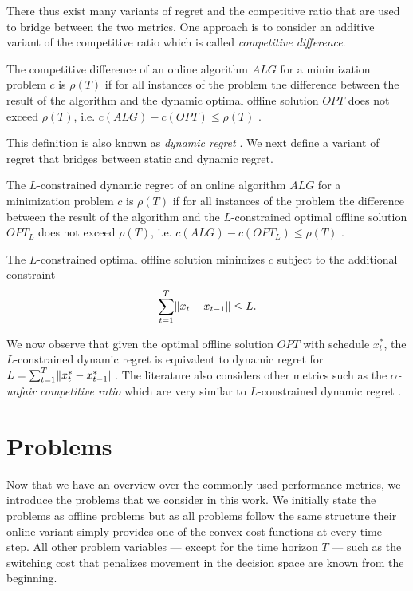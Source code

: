 There thus exist many variants of regret and the competitive ratio that are used to bridge between the two metrics. One approach is to consider an additive variant of the competitive ratio which is called \textit{competitive difference}.

\begin{definition}
The competitive difference of an online algorithm $ALG$ for a minimization problem $c$ is $\rho(T)$ if for all instances of the problem the difference between the result of the algorithm and the dynamic optimal offline solution $OPT$ does not exceed $\rho(T)$, i.e. $c(ALG) - c(OPT) \leq \rho(T)$ \cite{Chen2015}.
\end{definition}

This definition is also known as \textit{dynamic regret} \cite{Chen2018}. We next define a variant of regret that bridges between static and dynamic regret.

\begin{definition}
The $L$-constrained dynamic regret of an online algorithm $ALG$ for a minimization problem $c$ is $\rho(T)$ if for all instances of the problem the difference between the result of the algorithm and the $L$-constrained optimal offline solution $OPT_L$ does not exceed $\rho(T)$, i.e. $c(ALG) - c(OPT_L) \leq \rho(T)$ \cite{Chen2018}.

The $L$-constrained optimal offline solution minimizes $c$ subject to the additional constraint \begin{align*}
    \sum_{t=1}^T \lVert x_t - x_{t-1}\rVert \leq L.
\end{align*}
\end{definition}

We now observe that given the optimal offline solution $OPT$ with schedule $x_t^*$, the $L$-constrained dynamic regret is equivalent to dynamic regret for $L = \sum_{t=1}^T \lVert x_t^* - x_{t-1}^*\rVert$. The literature also considers other metrics such as the \textit{$\alpha$-unfair competitive ratio} which are very similar to $L$-constrained dynamic regret \cite{Andrew2015}.

\section{Problems}

Now that we have an overview over the commonly used performance metrics, we introduce the problems that we consider in this work. We initially state the problems as offline problems but as all problems follow the same structure their online variant simply provides one of the convex cost functions at every time step. All other problem variables --- except for the time horizon $T$ --- such as the switching cost that penalizes movement in the decision space are known from the beginning.

